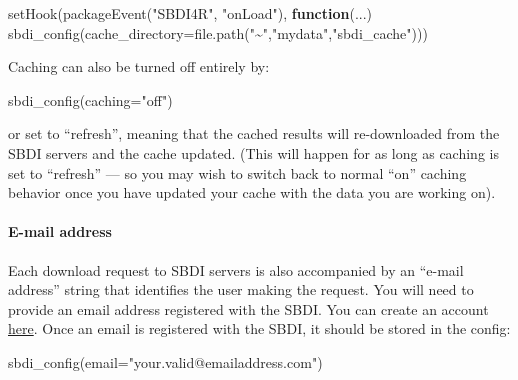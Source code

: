 \documentclass[
  10pt,
]{article}
\newenvironment{Shaded}{\begin{snugshade}}{\end{snugshade}}
\newcommand{\AttributeTok}[1]{\textcolor[rgb]{0.77,0.63,0.00}{#1}}
\newcommand{\ControlFlowTok}[1]{\textcolor[rgb]{0.13,0.29,0.53}{\textbf{#1}}}
\newcommand{\FunctionTok}[1]{\textcolor[rgb]{0.00,0.00,0.00}{#1}}
\newcommand{\NormalTok}[1]{#1}
\newcommand{\StringTok}[1]{\textcolor[rgb]{0.31,0.60,0.02}{#1}}
\begin{document}
\begin{Shaded}
\begin{Highlighting}[]
\FunctionTok{setHook}\NormalTok{(}\FunctionTok{packageEvent}\NormalTok{(}\StringTok{"SBDI4R"}\NormalTok{, }\StringTok{"onLoad"}\NormalTok{), }
        \ControlFlowTok{function}\NormalTok{(...) }\FunctionTok{sbdi\_config}\NormalTok{(}\AttributeTok{cache\_directory=}\FunctionTok{file.path}\NormalTok{(}\StringTok{"\textasciitilde{}"}\NormalTok{,}\StringTok{"mydata"}\NormalTok{,}\StringTok{"sbdi\_cache"}\NormalTok{)))}
\end{Highlighting}
\end{Shaded}

Caching can also be turned off entirely by:

\begin{Shaded}
\begin{Highlighting}[]
\FunctionTok{sbdi\_config}\NormalTok{(}\AttributeTok{caching=}\StringTok{"off"}\NormalTok{)}
\end{Highlighting}
\end{Shaded}

or set to ``refresh'', meaning that the cached results will re-downloaded from the SBDI servers and the cache updated. (This will happen for as long as caching is set to ``refresh'' --- so you may wish to switch back to normal ``on'' caching behavior once you have updated your cache with the data you are working on).

\hypertarget{e-mail-address}{%
\paragraph*{E-mail address}\label{e-mail-address}}

Each download request to SBDI servers is also accompanied by an ``e-mail address'' string that identifies the user making the request. You will need to provide an email address registered with the SBDI. You can create an account \href{https://auth.biodiversitydata.se/cas/login}{here}. Once an email is registered with the SBDI, it should be stored in the config:

\begin{Shaded}
\begin{Highlighting}[]
\FunctionTok{sbdi\_config}\NormalTok{(}\AttributeTok{email=}\StringTok{"your.valid@emailaddress.com"}\NormalTok{)}
\end{Highlighting}
\end{Shaded}
\end{document}
